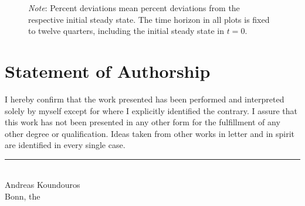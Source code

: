 \documentclass[a4paper,12pt]{article} %
\numberwithin{equation}{section} %
\numberwithin{figure}{section}
\numberwithin{table}{section}
\begin{document}
\begin{refsection}
\begin{appendices}
\begin{figure}[H]
     \vspace{10pt}
     
     \justifying
     \footnotesize
	\textit{Note}: Percent deviations mean percent deviations from the respective initial steady state. The time horizon in all plots is fixed to twelve quarters, including the initial steady state in $t=0$.
\end{figure}

\end{appendices}
\newpage
\thispagestyle{plain}
\renewcommand*{\thepage}{A-\Roman{page}} %

\printbibliography[heading=subbibliography, title={Appendix References}]

\cleardoublepage %

\renewcommand*{\thepage}{\arabic{page}} %

\end{refsection}


\newpage
\thispagestyle{plain}
\section*{Statement of Authorship} %
I hereby confirm that the work presented has been performed and interpreted solely by myself except for where I explicitly identified the contrary. I assure that this work has not been presented in any other form for the fulfillment of any other degree or qualification. Ideas taken from other works in letter and in spirit are identified in every single case.

\vspace{2cm}
\noindent
\rule{8cm}{0.4pt}\\
Andreas Koundouros\\
Bonn, the 
\end{document}
